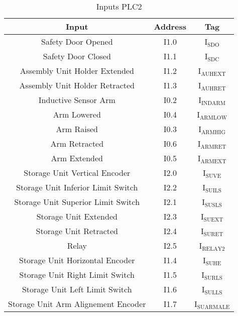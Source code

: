 \begin{table}[htbp]
\caption{Inputs PLC2}
\centering
\begin{tabular}{c|c|c}
Input & Address & Tag\\
\hline
Safety Door Opened & I1.0 & I\(_{\text{SDO}}\)\\
Safety Door Closed & I1.1 & I\(_{\text{SDC}}\)\\
Assembly Unit Holder Extended & I1.2 & I\(_{\text{AUHEXT}}\)\\
Assembly Unit Holder Retracted & I1.3 & I\(_{\text{AUHRET}}\)\\
Inductive Sensor Arm & I0.2 & I\(_{\text{INDARM}}\)\\
Arm Lowered & I0.4 & I\(_{\text{ARMLOW}}\)\\
Arm Raised & I0.3 & I\(_{\text{ARMHIG}}\)\\
Arm Retracted & I0.6 & I\(_{\text{ARMRET}}\)\\
Arm Extended & I0.5 & I\(_{\text{ARMEXT}}\)\\
Storage Unit Vertical Encoder & I2.0 & I\(_{\text{SUVE}}\)\\
Storage Unit Inferior Limit Switch & I2.2 & I\(_{\text{SUILS}}\)\\
Storage Unit Superior Limit Switch & I2.1 & I\(_{\text{SUSLS}}\)\\
Storage Unit Extended & I2.3 & I\(_{\text{SUEXT}}\)\\
Storage Unit Retracted & I2.4 & I\(_{\text{SURET}}\)\\
Relay & I2.5 & I\(_{\text{RELAY2}}\)\\
Storage Unit Horizontal Encoder & I1.4 & I\(_{\text{SUHE}}\)\\
Storage Unit Right Limit Switch & I1.5 & I\(_{\text{SURLS}}\)\\
Storage Unit Left Limit Switch & I1.6 & I\(_{\text{SULLS}}\)\\
Storage Unit Arm Alignement Encoder & I1.7 & I\(_{\text{SUARMALE}}\)\\
\end{tabular}
\end{table}

